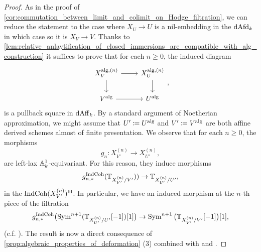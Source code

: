 \documentclass[10pt,a4paper,reqno]{amsart} %
\theoremstyle{plain}
\theoremstyle{definition}
\theoremstyle{remark}
\numberwithin{equation}{section}
\begin{document}
\begin{proof} As in the proof of \cref{cor:commutation_between_limit_and_colimit_on_Hodge_filtration}, we can reduce the statement to the case where $X_U \to U$ is a nil-embedding in the \infcat $\mathrm{dAfd}_k$
    in which case so it is $X_V \to V$.
    Thanks to \cref{lem:relative_anlaytification_of_closed_immersions_are_compatible_with_alg_construction}
    it suffices to prove that for each $n \ge 0$, the induced diagram
        \[
        \begin{tikzcd}
            X_V^{\mathrm{alg}, (n)} \ar{r} \ar{d} & X_U^{\mathrm{alg}, (n)} \ar{d} \\
            V \alg \ar{r} & U\alg  
        \end{tikzcd},
        \]
    is a pullback square in $\mathrm{dAff}_k$.
    By a standard argument of Noetherian approximation, we might assume that $U' \coloneqq U^\mathrm{alg} $ and $V' \coloneqq V^\mathrm{alg}$ are
    both affine derived schemes almost of finite presentation. We observe that for each $n \ge 0$, the morphisms
        \[
            g_n \colon X_{V'}^{(n)} \to X_{U'}^{(n)},
        \]
    are left-lax $\mathbb A^1_k$-equivariant. For this reason, they induce morphisms
        \[
            g_{n, *}^\mathrm{IndCoh}( \mathbb T_{X^{(n)}_{V'}/ V'})) \to \mathbb T_{X^{(n)}_{U'} / U'}  ,
        \]
    in the \infcat $\mathrm{Ind}\mathrm{Coh}(X_{V'}^{(n)})^\mathrm{fil}$. In particular, we have an induced morphism
    at the $n$-th piece of the filtration
        \[
                g_{n, *}^\mathrm{IndCoh}\big( \mathrm{Sym}^{n+1}(\mathbb T_{X^{(n)}_{U'}/ U'}[-1])[1]\big) \to  \operatorname{Sym}^{n+1}\big( \mathbb T_{X^{(n)}_{V'} / V'}[-1]\big)[1],
        \]
    (c.f. \cite[Theorem 9.5.1.3]{Gaitsgory_Study_II}). 
    The result is now a direct consequence of \cref{prop:algebraic_properties_of_deformation} (3)
    combined with \cite[Proposition 5.12]{Porta_Yu_Representability} and \cite[Proposition 2.5.4.5]{Lurie_SAG}.
\end{proof}
\end{document}
